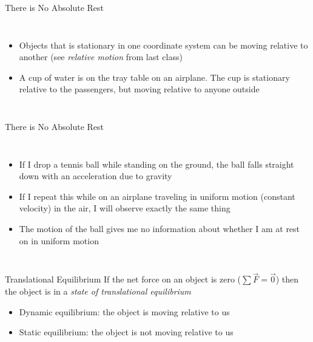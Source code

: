 \documentclass[12pt,compress,aspectratio=169]{beamer}
\begin{document}
\begin{frame}{There is No Absolute Rest}
  \begin{center}
  \end{center}
  \begin{columns}
    
    \vspace{-.3in}
    \begin{itemize}
    \item Objects that is stationary in one coordinate system can be moving
      relative to another (see \emph{relative motion} from last class)
    \item A cup of water is on the tray table on an airplane. The cup is
      stationary relative to the passengers, but moving relative to anyone
      outside
    \end{itemize}
  \end{columns}
\end{frame}



\begin{frame}{There is No Absolute Rest}
  \begin{center}
  \end{center}
  \begin{columns}
    
    \vspace{-.3in}
    \begin{itemize}
    \item If I drop a tennis ball while standing on the ground, the ball falls
      straight down with an acceleration due to gravity
    \item If I repeat this while on an airplane traveling in uniform motion
      (constant velocity) in the air, I will observe exactly the same thing
    \item The motion of the ball gives me no information about whether I am
      at rest on in uniform motion
    \end{itemize}
  \end{columns}
\end{frame}




\begin{frame}{Translational Equilibrium}
  If the net force on an object is zero ($\sum\vec F=\vec 0$) then the
  object is in a \emph{state of translational equilibrium}
  \begin{itemize}
  \item Dynamic equilibrium: the object is moving relative to us
  \item Static equilibrium: the object is not moving relative to us
  \end{itemize}
\end{frame}
\end{document}
